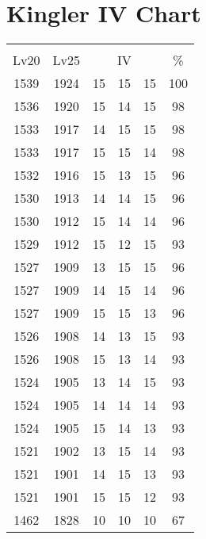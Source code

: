 \documentclass{article}%
\begin{document}
%
\normalsize%
\section{Kingler IV Chart}%
\label{sec:Kingler IV Chart}%
\renewcommand{\arraystretch}{1.5}%
\begin{tabular}{|c|c|c|c|c|c|}%
\hline%
\multicolumn{6}{|c|}{\textcolor{white}{ 
\linebreak{Kingler}
}%
\cellcolor{black}}\\%
\multicolumn{1}{|c}{Lv20}&\multicolumn{1}{c|}{Lv25}&\multicolumn{3}{c|}{IV}&\multicolumn{1}{|c|}{\%}\\%
\hline%
\rowcolor{color100}%
1539&1924&15&15&15&100\\%
\hline%
\rowcolor{color98}%
1536&1920&15&14&15&98\\%
\hline%
\rowcolor{color98}%
1533&1917&14&15&15&98\\%
\hline%
\rowcolor{color98}%
1533&1917&15&15&14&98\\%
\hline%
\rowcolor{color96}%
1532&1916&15&13&15&96\\%
\hline%
\rowcolor{color96}%
1530&1913&14&14&15&96\\%
\hline%
\rowcolor{color96}%
1530&1912&15&14&14&96\\%
\hline%
\rowcolor{color93}%
1529&1912&15&12&15&93\\%
\hline%
\rowcolor{color96}%
1527&1909&13&15&15&96\\%
\hline%
\rowcolor{color96}%
1527&1909&14&15&14&96\\%
\hline%
\rowcolor{color96}%
1527&1909&15&15&13&96\\%
\hline%
\rowcolor{color93}%
1526&1908&14&13&15&93\\%
\hline%
\rowcolor{color93}%
1526&1908&15&13&14&93\\%
\hline%
\rowcolor{color93}%
1524&1905&13&14&15&93\\%
\hline%
\rowcolor{color93}%
1524&1905&14&14&14&93\\%
\hline%
\rowcolor{color93}%
1524&1905&15&14&13&93\\%
\hline%
\rowcolor{color93}%
1521&1902&13&15&14&93\\%
\hline%
\rowcolor{color93}%
1521&1901&14&15&13&93\\%
\hline%
\rowcolor{color93}%
1521&1901&15&15&12&93\\%
\hline%
\rowcolor{color91}%
1462&1828&10&10&10&67\\%
\end{tabular}

%
\end{document}
